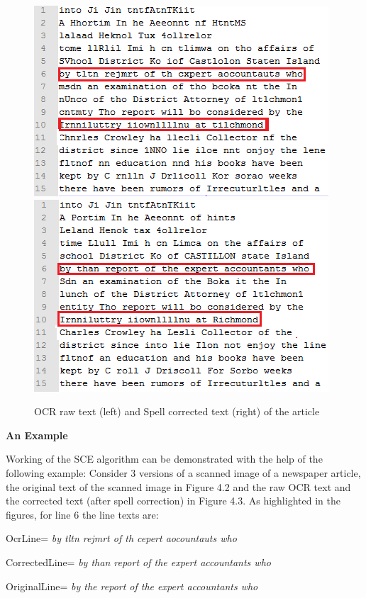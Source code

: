 \documentclass[letterpaper,11pt]{report}
\begin{document}
\begin{figure}[h]
\includegraphics[scale=0.75]{ocr3}
\includegraphics[scale=0.75]{corrected3}
\caption{OCR raw text (left) and Spell corrected text (right) of the article}
\end{figure} 


\textbf{An Example}


Working of the SCE algorithm can be demonstrated with the help of the following example:
Consider 3 versions of a scanned image of a newspaper article,  the original text of the scanned image in Figure 4.2 and the raw OCR text and the corrected text (after spell correction) in Figure 4.3. As highlighted in the figures, for line 6 the line texts are:

 OcrLine= \textit{by tltn rejmrt of th cepert aocountauts who}

CorrectedLine= \textit{by than report of the expert accountants who}

OriginalLine= \textit{by the report of the expert accountants who} 
\end{document}
